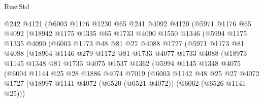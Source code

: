 \begin{lexlean}{RustStd}
\begin{coremodule}
                @242
                @4121
                (@6003
                  @1176
                  @1230
                  @65
                  @241
                  @4092
                  @4120
                  (@5971
                    @1176
                    @65
                    @4092
                    (@18942
                      @1175
                      @1335
                      @65
                      @1733
                      @4090
                      @1550
                      @1346
                      (@5994
                        @1175
                        @1335
                        @4090
                        (@6003
                          @1173
                          @48
                          @81
                          @27
                          @4088
                          @1727
                          (@5971
                            @1173
                            @81
                            @4088
                            (@18964
                              @1146
                              @279
                              @1172
                              @81
                              @1733
                              @4077
                              @1733
                              @4088
                              (@18973
                                @1145
                                @1348
                                @81
                                @1733
                                @4075
                                @1537
                                @1362
                                (@5994
                                  @1145
                                  @1348
                                  @4075
                                  (@6004
                                    @1144
                                    @25
                                    @28
                                    @1886
                                    @4074
                                    @7019
                                    (@6003
                                      @1142
                                      @48
                                      @25
                                      @27
                                      @4072
                                      @1727
                                      (@18997
                                        @1141
                                        @4072
                                        (@6520 (@6521 @4072))
                                        (@6062 (@6526 @1141 @25)))

\end{coremodule}
\end{lexlean}
